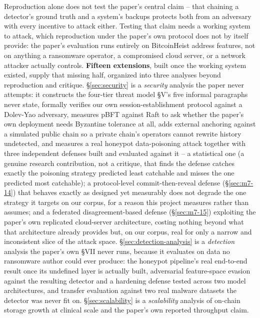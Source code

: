 \documentclass[conference]{IEEEtran}
\begin{document}
Reproduction alone does not test the paper's central claim -- that chaining a detector's ground
truth and a system's backups protects both from an adversary with every incentive to attack
either. Testing that claim needs a working system to attack, which reproduction under the
paper's own protocol does not by itself provide: the paper's evaluation runs entirely on
BitcoinHeist address features, not on anything a ransomware operator, a compromised cloud server,
or a network attacker actually controls. \textbf{Fifteen extensions}, built once the working
system existed, supply that missing half, organized into three analyses beyond reproduction and
critique. \S\ref{sec:security} is a \emph{security} analysis the paper never attempts: it
constructs the four-tier threat model \S V's five informal paragraphs never state, formally
verifies our own session-establishment protocol against a Dolev-Yao adversary, measures pBFT
against Raft to ask whether the paper's own deployment needs Byzantine tolerance at all, adds
external anchoring against a simulated public chain so a private chain's operators cannot rewrite
history undetected, and measures a real honeypot data-poisoning attack together with three
independent defenses built and evaluated against it -- a statistical one (a genuine research
contribution, not a critique, that finds the defense catches exactly the poisoning strategy
predicted least catchable and misses the one predicted most catchable); a protocol-level
commit-then-reveal defense (\S\ref{sec:m7-14}) that behaves exactly as designed yet measurably
does not degrade the one strategy it targets on our corpus, for a reason this project measures
rather than assumes; and a federated disagreement-based defense (\S\ref{sec:m7-15}) exploiting the
paper's own replicated cloud-server architecture, costing nothing beyond what that architecture
already provides but, on our corpus, real for only a narrow and inconsistent slice of the attack
space. \S\ref{sec:detection-analysis} is a
\emph{detection} analysis the paper's own \S VII never runs, because it evaluates on data no
ransomware author could ever produce: the honeypot pipeline's real end-to-end result once its
undefined layer is actually built, adversarial feature-space evasion against the resulting
detector and a hardening defense tested across two model architectures, and transfer evaluation
against two real malware datasets the detector was never fit on. \S\ref{sec:scalability} is a
\emph{scalability} analysis of on-chain storage growth at clinical scale and the paper's own
reported throughput claim.
\end{document}
